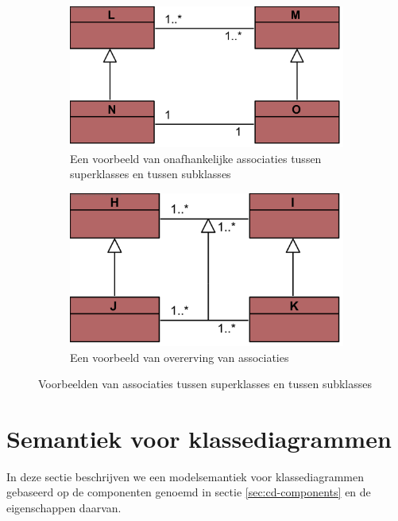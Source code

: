 \begin{figure}
	\centering
	\begin{subfigure}{0.4\textwidth}
		\includegraphics[width=\textwidth]{chap-consistentie/assoc-hier.png}
		\caption{Een voorbeeld van onafhankelijke associaties tussen superklasses en tussen subklasses}
		\label{fig:assoc-hier}
	\end{subfigure}
	\hfill
	\begin{subfigure}{0.4\textwidth}
		\vspace{-0.2cm}
		\includegraphics[width=\textwidth]{chap-consistentie/assoc-gen.png}
		\caption{Een voorbeeld van overerving van associaties}
		\label{fig:assoc-gen}
	\end{subfigure}
	\caption{Voorbeelden van associaties tussen superklasses en tussen subklasses}
	\label{fig:assoc-hier-gen}
\end{figure}

\section{Semantiek voor klassediagrammen}\label{sec:cd-semantics}

In deze sectie beschrijven we een modelsemantiek voor klassediagrammen gebaseerd op de componenten genoemd in sectie \ref{sec:cd-components} en de eigenschappen daarvan.

